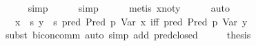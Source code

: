 \begin{isabellebody}
\ \ \ \ \isamarkupfalse%
\ simp\isanewline
\ \ \ \ \isamarkupfalse%
\ simp\isanewline
\ \ \ \ \isamarkupfalse%
\ {}metis\ x{}not{}y{}\isanewline
\ \ \ \ \isamarkupfalse%
\ auto\isanewline
\ \ \isamarkupfalse%
\ \isamarkupfalse%
\ {}{}{}{}\ {}\ x\ {}{}\ s{}\ y\ {}{}\ s{}\ pred\ {}Pred\ p\ {}Var\ x{}{}\ iff\ pred\ {}Pred\ p\ {}Var\ y{}{}{}\isanewline
\ \ \ \ \isamarkupfalse%
\ {}subst\ bicon{}comm{}\ {}auto\ simp\ add{}\ pred{}closed{}\isanewline
\ \ \isamarkupfalse%
\ \isamarkupfalse%
\ {}thesis\ \isamarkupfalse%
\isanewline
{}\isamarkupfalse%
%
\endisatagproof
{\isafoldproof}%
%
\isadelimproof
\isanewline
%
\endisadelimproof
%
\isadelimtheory
\isanewline
%
\endisadelimtheory
%
\isatagtheory
{}\isamarkupfalse%
%
\endisatagtheory
{\isafoldtheory}%
%
\isadelimtheory
\isanewline
%
\endisadelimtheory
\end{isabellebody}%

